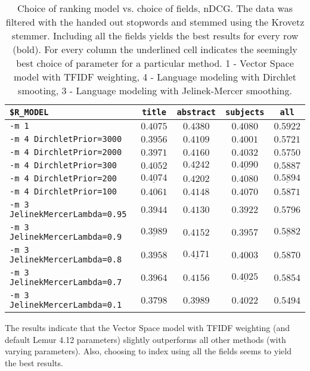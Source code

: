 \begin{table}[h!]
\centering
\begin{tabular}{lcccc}
\lstinline|$R_MODEL| & \lstinline$title$ & \lstinline$abstract$ &
    \lstinline$subjects$ & \lstinline$all$ \\
\hline
\lstinline$-m 1$ & $0.4075$ & $0.4380$ & $0.4080$ & $\mathbf{0.5922}$ \\
\hline
\lstinline$-m 4 DirchletPrior=3000$ & $0.3956$ & $0.4109$ & $0.4001$ & $\mathbf{0.5721}$ \\
\lstinline$-m 4 DirchletPrior=2000$ & $0.3971$ & $0.4160$ & $0.4032$ & $\mathbf{0.5750}$ \\
\lstinline$-m 4 DirchletPrior=300$ & $0.4052$ & $\underline{0.4242}$ & $\underline{0.4090}$ & $\mathbf{0.5887}$ \\
\lstinline$-m 4 DirchletPrior=200$ & $\underline{0.4074}$ & $0.4202$ & $0.4080$ & $\underline{\mathbf{0.5894}}$ \\
\lstinline$-m 4 DirchletPrior=100$ & $0.4061$ & $0.4148$ & $0.4070$ & $\mathbf{0.5871}$ \\
\hline
\lstinline$-m 3 JelinekMercerLambda=0.95$ & $0.3944$ & $0.4130$ & $0.3922$ & $\mathbf{0.5796}$ \\
\lstinline$-m 3 JelinekMercerLambda=0.9$ & $\underline{0.3989}$ & $0.4152$ & $0.3957$ &
    $\underline{\mathbf{0.5882}}$ \\
\lstinline$-m 3 JelinekMercerLambda=0.8$ & $0.3958$ & $\underline{0.4171}$ & $0.4003$ & $\mathbf{0.5870}$ \\
\lstinline$-m 3 JelinekMercerLambda=0.7$ & $0.3964$ & $0.4156$ & $\underline{0.4025}$ & $\mathbf{0.5854}$ \\
\lstinline$-m 3 JelinekMercerLambda=0.1$ & $0.3798$ & $0.3989$ & $0.4022$ & $\mathbf{0.5494}$ \\
\hline
\end{tabular}
\caption[]{Choice of ranking model vs. choice of fields, nDCG. The data was
filtered with the handed out stopwords and stemmed using the Krovetz stemmer.
Including all the fields yields the best results for every row (bold).  For
every column the underlined cell indicates the seemingly best choice of
parameter for a particular method. 1 - Vector Space model with TFIDF weighting,
4 - Language modeling with Dirchlet smooting, 3 - Language modeling with
Jelinek-Mercer smoothing.}
\label{table:ranking-model-vs-fields}
\end{table}

The results indicate that the Vector Space model with TFIDF weighting (and
default Lemur 4.12 parameters) slightly outperforms all other methods (with
varying parameters). Also, choosing to index using all the fields seems to
yield the best results.

